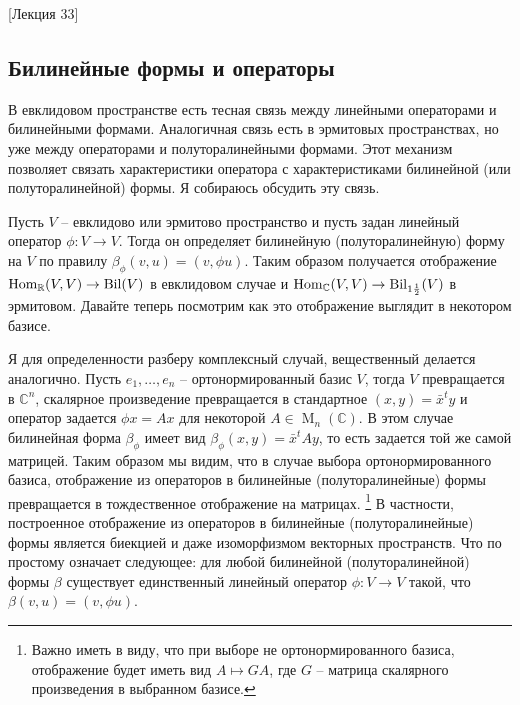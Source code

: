 [Лекция 33]


\subsection{Билинейные формы и операторы}
\label{section::BilinOper}

В евклидовом пространстве есть тесная связь между линейными операторами и билинейными формами.
Аналогичная связь есть в эрмитовых пространствах, но уже между операторами и полуторалинейными формами.
Этот механизм позволяет связать характеристики оператора с характеристиками билинейной (или полуторалинейной) формы.
Я собираюсь обсудить эту связь.


Пусть $V$ -- евклидово или эрмитово пространство и пусть задан линейный оператор $\phi\colon V\to V$.
Тогда он определяет билинейную (полуторалинейную) форму на $V$ по правилу $\beta_\phi(v, u) = (v, \phi u)$.
Таким образом получается отображение $\operatorname{Hom}_\mathbb R(V, V)\to \operatorname{Bil}(V)$ в евклидовом случае и $\operatorname{Hom}_\mathbb C(V, V)\to \operatorname{Bil}_{1\frac{1}{2}}(V)$ в эрмитовом.
Давайте теперь посмотрим как это отображение выглядит в некотором базисе.

Я для определенности разберу комплексный случай, вещественный делается аналогично.
Пусть $e_1,\ldots,e_n$ -- ортонормированный базис $V$, тогда $V$ превращается в $\mathbb C^n$, скалярное произведение превращается в стандартное $(x, y) = \bar x^t y$ и оператор задается $\phi x = Ax$ для некоторой $A\in \operatorname{M}_n(\mathbb C)$.
В этом случае билинейная форма $\beta_\phi$ имеет вид $\beta_\phi(x,y) = \bar x^t A y$, то есть задается той же самой матрицей.
Таким образом мы видим, что в случае выбора ортонормированного базиса, отображение из операторов в билинейные (полуторалинейные) формы превращается в тождественное отображение на матрицах.%
\footnote{Важно иметь в виду, что при выборе не ортонормированного базиса, отображение будет иметь вид $A\mapsto G A$, где $G$ -- матрица скалярного произведения в выбранном базисе.}
В частности, построенное отображение из операторов в билинейные (полуторалинейные) формы является биекцией и даже изоморфизмом векторных пространств.
Что по простому означает следующее: для любой билинейной (полуторалинейной) формы $\beta$ существует единственный линейный оператор $\phi\colon V\to V$ такой, что $\beta(v,u) = (v, \phi u)$.

